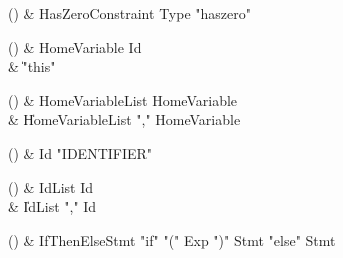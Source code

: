 \begin{bbgrammarappendix}{3.3in}

() & HasZeroConstraint \label{prod:HasZeroConstraint}  \: Type  \xcd"haszero"  \\


\end{bbgrammarappendix}

\begin{bbgrammarappendix}{3.8in}

() & HomeVariable \label{prod:HomeVariable}  \: Id  \\

 &    \| \xcd"this" \\

\end{bbgrammarappendix}

\begin{bbgrammarappendix}{3.4in}

() & HomeVariableList \label{prod:HomeVariableList}  \: HomeVariable  \\

 &    \| HomeVariableList \xcd"," HomeVariable \\

\end{bbgrammarappendix}

\begin{bbgrammarappendix}{4.8in}

() & Id \label{prod:Id}  \: \xcd"IDENTIFIER"   \\


\end{bbgrammarappendix}

\begin{bbgrammarappendix}{4.4in}

() & IdList \label{prod:IdList}  \: Id  \\

 &    \| IdList \xcd"," Id \\

\end{bbgrammarappendix}

\begin{bbgrammarappendix}{3.6in}

() & IfThenElseStmt \label{prod:IfThenElseStmt}  \: \xcd"if" \xcd"(" Exp \xcd")" Stmt  \xcd"else" Stmt   \\


\end{bbgrammarappendix}

